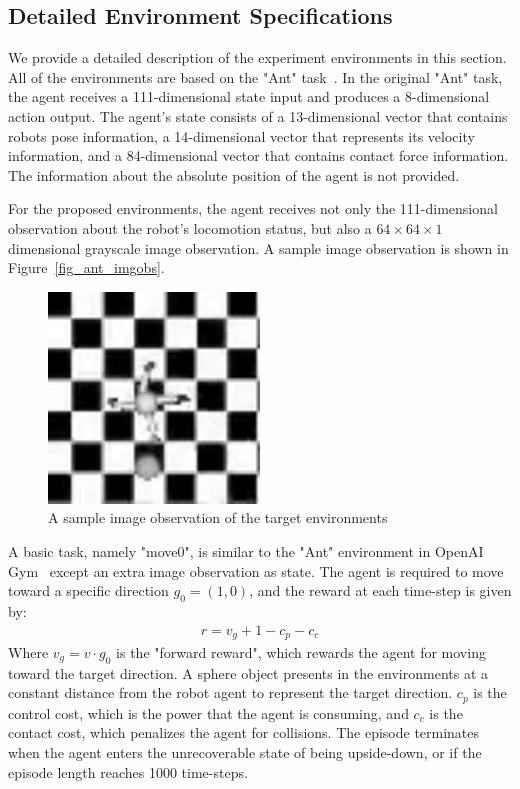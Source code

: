 
\subsection{Detailed Environment Specifications}
We provide a detailed description of the experiment environments in this section. All of the environments are based on the "Ant" task~\cite{openaigym}. In the original "Ant" task, the agent receives a 111-dimensional state input and produces a 8-dimensional action output. The agent's state consists of a 13-dimensional vector that contains robots pose information, a 14-dimensional vector that represents its velocity information, and a 84-dimensional vector that contains contact force information. The information about the absolute position of the agent is not provided.

For the proposed environments, the agent receives not only the 111-dimensional observation about the robot's locomotion status, but also a $64\times 64\times 1$ dimensional grayscale image observation. A sample image observation is shown in Figure~\ref{fig_ant_imgobs}.

\begin{figure}[H]
	\includegraphics[width=0.5\textwidth]{images/ant_imgobs.png}
	\centering
	\caption{A sample image observation of the target environments}
\end{figure}\label{fig_ant_imgobs}

A basic task, namely "move0", is similar to the "Ant" environment in OpenAI Gym~\cite{openaigym} except an extra image observation as state. The agent is required to move toward a specific direction $g_0=(1,0)$, and the reward at each time-step is given by:
\begin{align}
r = v_g + 1-c_p-c_c
\end{align}
Where $v_g=v \cdot g_0$ is the "forward reward", which rewards the agent for moving toward the target direction. A sphere object presents in the environments at a constant distance from the robot agent to represent the target direction.  $c_p$ is the control cost, which is the power that the agent is consuming, and $c_c$ is the contact cost, which penalizes the agent for collisions. The episode terminates when the agent enters the unrecoverable state of being upside-down, or if the episode length reaches 1000 time-steps.

